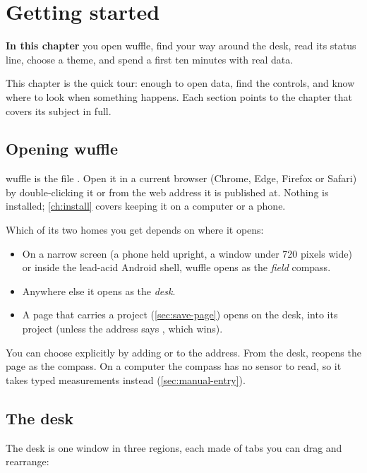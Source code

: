\chapter{Getting started}\label{ch:start}
\begin{goals}
\textbf{In this chapter} you open wuffle, find your way around the desk, read its status line, choose a
theme, and spend a first ten minutes with real data.
\end{goals}

This chapter is the quick tour: enough to open data, find the controls, and know where to look when
something happens. Each section points to the chapter that covers its subject in full.

\section{Opening wuffle}\label{sec:opening}

wuffle is the file . Open it in a current browser (Chrome, Edge, Firefox or Safari)
by double-clicking it or from the web address it is published at. Nothing is installed; \cref{ch:install}
covers keeping it on a computer or a phone.

Which of its two homes you get depends on where it opens:

\begin{itemize}
\item On a narrow screen (a phone held upright, a window under 720 pixels wide) or inside the lead-acid
Android shell, wuffle opens as the \emph{field} compass.
\item Anywhere else it opens as the \emph{desk}.
\item A page that carries a project (\cref{sec:save-page}) opens on the desk, into its project (unless
the address says , which wins).
\end{itemize}

You can choose explicitly by adding  or  to the address. From the desk,
 reopens the page as the compass. On a computer the compass has no
sensor to read, so it takes typed measurements instead (\cref{sec:manual-entry}).

\section{The desk}\label{sec:desk}

The desk is one window in three regions, each made of tabs you can drag and rearrange:

